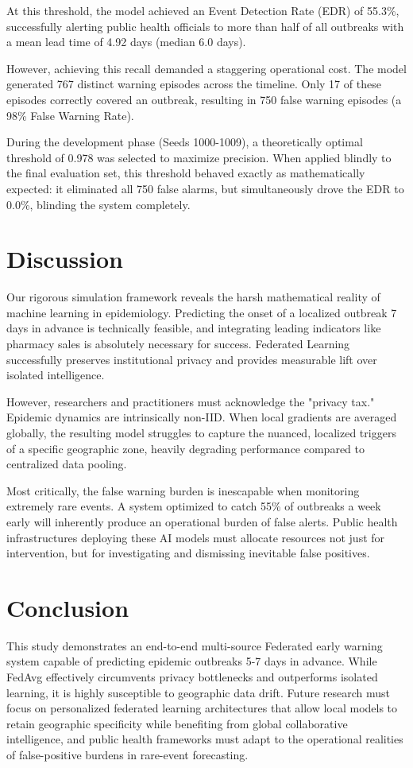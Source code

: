 \documentclass[conference]{IEEEtran}
\begin{document}
At this threshold, the model achieved an Event Detection Rate (EDR) of 55.3\%, successfully alerting public health officials to more than half of all outbreaks with a mean lead time of 4.92 days (median 6.0 days). 

However, achieving this recall demanded a staggering operational cost. The model generated 767 distinct warning episodes across the timeline. Only 17 of these episodes correctly covered an outbreak, resulting in 750 false warning episodes (a 98\% False Warning Rate). 

During the development phase (Seeds 1000-1009), a theoretically optimal threshold of 0.978 was selected to maximize precision. When applied blindly to the final evaluation set, this threshold behaved exactly as mathematically expected: it eliminated all 750 false alarms, but simultaneously drove the EDR to 0.0\%, blinding the system completely.

\section{Discussion}

Our rigorous simulation framework reveals the harsh mathematical reality of machine learning in epidemiology. Predicting the onset of a localized outbreak 7 days in advance is technically feasible, and integrating leading indicators like pharmacy sales is absolutely necessary for success. Federated Learning successfully preserves institutional privacy and provides measurable lift over isolated intelligence.

However, researchers and practitioners must acknowledge the "privacy tax." Epidemic dynamics are intrinsically non-IID. When local gradients are averaged globally, the resulting model struggles to capture the nuanced, localized triggers of a specific geographic zone, heavily degrading performance compared to centralized data pooling. 

Most critically, the false warning burden is inescapable when monitoring extremely rare events. A system optimized to catch 55\% of outbreaks a week early will inherently produce an operational burden of false alerts. Public health infrastructures deploying these AI models must allocate resources not just for intervention, but for investigating and dismissing inevitable false positives.

\section{Conclusion}
This study demonstrates an end-to-end multi-source Federated early warning system capable of predicting epidemic outbreaks 5-7 days in advance. While FedAvg effectively circumvents privacy bottlenecks and outperforms isolated learning, it is highly susceptible to geographic data drift. Future research must focus on personalized federated learning architectures that allow local models to retain geographic specificity while benefiting from global collaborative intelligence, and public health frameworks must adapt to the operational realities of false-positive burdens in rare-event forecasting.
\end{document}
